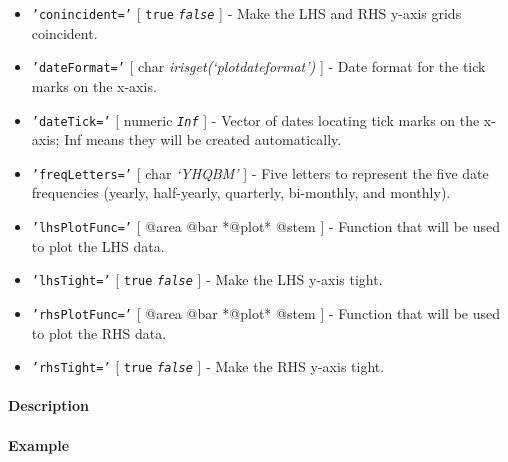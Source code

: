 \begin{itemize}
\item
  \texttt{'conincident='} {[} \texttt{true} \textbar{}
  \emph{\texttt{false}} {]} - Make the LHS and RHS y-axis grids
  coincident.
\item
  \texttt{'dateFormat='} {[} char \textbar{}
  \emph{irisget(`plotdateformat')} {]} - Date format for the tick marks
  on the x-axis.
\item
  \texttt{'dateTick='} {[} numeric \textbar{} \emph{\texttt{Inf}} {]} -
  Vector of dates locating tick marks on the x-axis; Inf means they will
  be created automatically.
\item
  \texttt{'freqLetters='} {[} char \textbar{} \emph{`YHQBM'} {]} - Five
  letters to represent the five date frequencies (yearly, half-yearly,
  quarterly, bi-monthly, and monthly).
\item
  \texttt{'lhsPlotFunc='} {[} @area \textbar{} @bar \textbar{} *@plot*
  \textbar{} @stem {]} - Function that will be used to plot the LHS
  data.
\item
  \texttt{'lhsTight='} {[} \texttt{true} \textbar{}
  \emph{\texttt{false}} {]} - Make the LHS y-axis tight.
\item
  \texttt{'rhsPlotFunc='} {[} @area \textbar{} @bar \textbar{} *@plot*
  \textbar{} @stem {]} - Function that will be used to plot the RHS
  data.
\item
  \texttt{'rhsTight='} {[} \texttt{true} \textbar{}
  \emph{\texttt{false}} {]} - Make the RHS y-axis tight.
\end{itemize}

\paragraph{Description}\label{description}

\paragraph{Example}\label{example}


